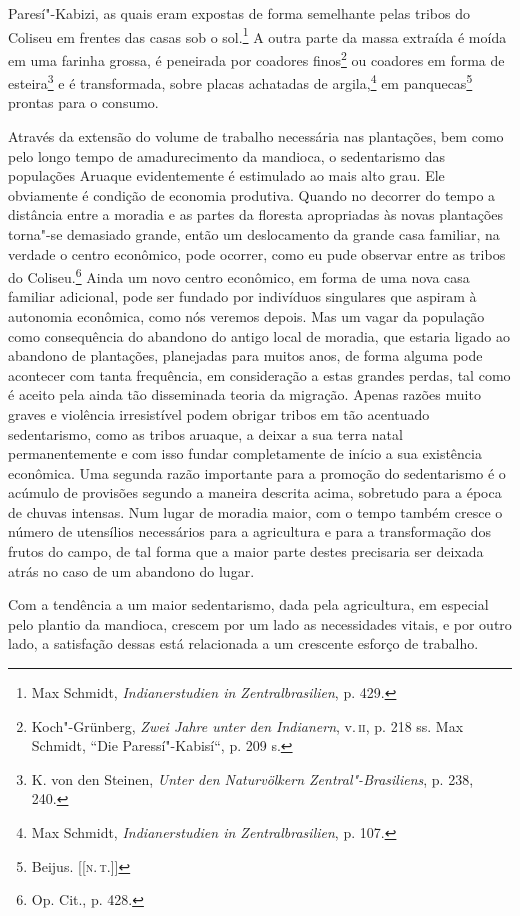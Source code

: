 Paresí"-Kabizi, as quais eram expostas de forma semelhante pelas tribos
do Coliseu em frentes das casas sob o sol.\footnote{Max Schmidt,
  \emph{Indianerstudien in Zentralbrasilien}, p. 429.} A outra parte da
massa extraída é moída em uma farinha grossa, é peneirada por coadores
finos\footnote{Koch"-Grünberg, \emph{Zwei Jahre unter den Indianern}, v.\,\textsc{ii}, p. 218 ss. Max Schmidt, ``Die Paressí"-Kabisí``, p. 209 s.} ou
coadores em forma de esteira\footnote{K. von den Steinen, \emph{Unter
  den Naturvölkern Zentral"-Brasiliens}, p. 238, 240.} e é transformada,
sobre placas achatadas de argila,\footnote{Max Schmidt,
  \emph{Indianerstudien in Zentralbrasilien}, p. 107.} em panquecas\footnote{Beijus. {[}{[}\textsc{n.\,t.}{]}{]}}
 prontas para o consumo.

Através da extensão do volume de trabalho necessária nas plantações, bem
como pelo longo tempo de amadurecimento da mandioca, o sedentarismo das
populações Aruaque evidentemente é estimulado ao mais alto grau. Ele
obviamente é condição de economia produtiva. Quando no decorrer do
tempo a distância entre a moradia e as partes da floresta apropriadas às
novas plantações torna"-se demasiado grande, então um deslocamento da
grande casa familiar, na verdade o centro econômico, pode ocorrer, como
eu pude observar entre as tribos do Coliseu.\footnote{Op. Cit., p. 428.}
Ainda um novo centro econômico, em forma de uma nova casa familiar
adicional, pode ser fundado por indivíduos singulares que aspiram à
autonomia econômica, como nós veremos depois. Mas um vagar da população
como consequência do abandono do antigo local de moradia, que estaria
ligado ao abandono de plantações, planejadas para muitos anos, de forma
alguma pode acontecer com tanta frequência, em consideração a estas
grandes perdas, tal como é aceito pela ainda tão disseminada teoria da
migração. Apenas razões muito graves e violência irresistível podem
obrigar tribos em tão acentuado sedentarismo, como as tribos aruaque, a
deixar a sua terra natal permanentemente e com isso fundar
completamente de início a sua existência econômica. Uma segunda razão
importante para a promoção do sedentarismo é o acúmulo de provisões
segundo a maneira descrita acima, sobretudo para a época de chuvas
intensas. Num lugar de moradia maior, com o tempo também cresce o
número de utensílios necessários para a agricultura e para a
transformação dos frutos do campo, de tal forma que a maior parte destes
precisaria ser deixada atrás no caso de um abandono do lugar.

Com a tendência a um maior sedentarismo, dada pela agricultura, em
especial pelo plantio da mandioca, crescem por um lado as necessidades
vitais, e por outro lado, a satisfação dessas está relacionada a um
crescente esforço de trabalho.


